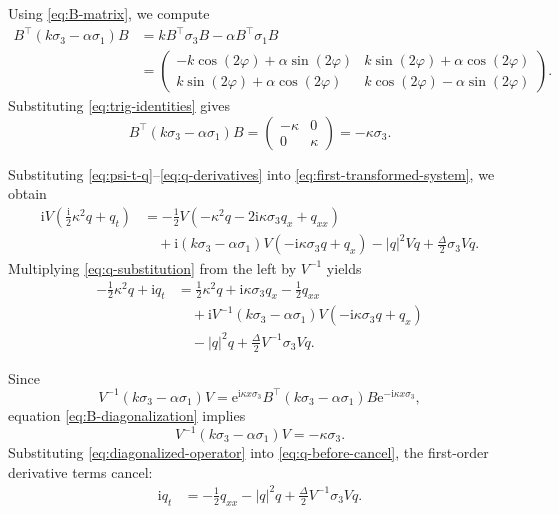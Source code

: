 \documentclass{amsart}
\numberwithin{equation}{hw}
\begin{document}
Using
\eqref{eq:B-matrix}, we compute
\begin{align}
B^\top(k\sigma_3-\alpha\sigma_1)B
&=
kB^\top\sigma_3B-\alpha B^\top\sigma_1B
\nonumber\\
&=
\begin{pmatrix}
-k\cos(2\varphi)+\alpha\sin(2\varphi)
&
k\sin(2\varphi)+\alpha\cos(2\varphi)
\\
k\sin(2\varphi)+\alpha\cos(2\varphi)
&
k\cos(2\varphi)-\alpha\sin(2\varphi)
\end{pmatrix}.
\end{align}
Substituting \eqref{eq:trig-identities} gives
\begin{equation}
B^\top(k\sigma_3-\alpha\sigma_1)B
=
\begin{pmatrix}
-\kappa & 0
\\
0 & \kappa
\end{pmatrix}
=
-\kappa\sigma_3.
\label{eq:B-diagonalization}
\end{equation}

Substituting \eqref{eq:psi-t-q}--\eqref{eq:q-derivatives} into
\eqref{eq:first-transformed-system}, we obtain
\begin{align}
\mathrm{i}V
\left(
\frac{\mathrm{i}}{2}\kappa^2q+q_t
\right)
&=
-\frac12
V
\left(
-\kappa^2q
-2\mathrm{i}\kappa\sigma_3q_x
+q_{xx}
\right)
\nonumber\\
&\quad
+
\mathrm{i}(k\sigma_3-\alpha\sigma_1)
V
\left(
-\mathrm{i}\kappa\sigma_3q+q_x
\right)
-|q|^2Vq
+\frac{\Delta}{2}\sigma_3Vq.
\label{eq:q-substitution}
\end{align}
Multiplying \eqref{eq:q-substitution} from the left by $V^{-1}$ yields
\begin{align}
-\frac12\kappa^2q+\mathrm{i}q_t
&=
\frac12\kappa^2q
+\mathrm{i}\kappa\sigma_3q_x
-\frac12q_{xx}
\nonumber\\
&\quad
+
\mathrm{i}V^{-1}(k\sigma_3-\alpha\sigma_1)V
\left(
-\mathrm{i}\kappa\sigma_3q+q_x
\right)
\nonumber\\
&\quad
-|q|^2q
+\frac{\Delta}{2}V^{-1}\sigma_3Vq.
\label{eq:q-before-cancel}
\end{align}

Since
\begin{equation}
V^{-1}(k\sigma_3-\alpha\sigma_1)V
=
{\mathrm e}^{\mathrm{i}\kappa x\sigma_3}
B^\top(k\sigma_3-\alpha\sigma_1)B
{\mathrm e}^{-\mathrm{i}\kappa x\sigma_3},
\end{equation}
equation \eqref{eq:B-diagonalization} implies
\begin{equation}
V^{-1}(k\sigma_3-\alpha\sigma_1)V
=
-\kappa\sigma_3.
\label{eq:diagonalized-operator}
\end{equation}
Substituting \eqref{eq:diagonalized-operator} into
\eqref{eq:q-before-cancel}, the first-order derivative terms cancel:
\begin{align}
\mathrm{i}q_t
&=
-\frac12q_{xx}
-|q|^2q
+\frac{\Delta}{2}V^{-1}\sigma_3Vq.
\label{eq:q-equation-pre-final}
\end{align}
\end{document}
